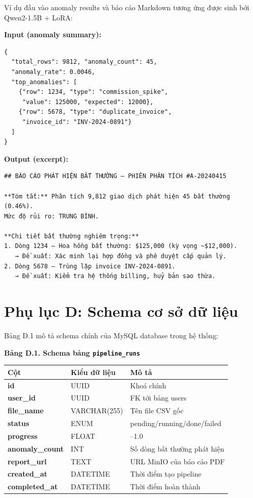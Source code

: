 Ví dụ đầu vào anomaly results và báo cáo Markdown tương ứng được sinh bởi Qwen2-1.5B + LoRA:

\textbf{Input (anomaly summary):}
\begin{verbatim}
{
  "total_rows": 9812, "anomaly_count": 45,
  "anomaly_rate": 0.0046,
  "top_anomalies": [
    {"row": 1234, "type": "commission_spike",
     "value": 125000, "expected": 12000},
    {"row": 5678, "type": "duplicate_invoice",
     "invoice_id": "INV-2024-0891"}
  ]
}
\end{verbatim}

\textbf{Output (excerpt):}
\begin{verbatim}
## BÁO CÁO PHÁT HIỆN BẤT THƯỜNG – PHIÊN PHÂN TÍCH #A-20240415

**Tóm tắt:** Phân tích 9,812 giao dịch phát hiện 45 bất thường (0.46%).
Mức độ rủi ro: TRUNG BÌNH.

**Chi tiết bất thường nghiêm trọng:**
1. Dòng 1234 – Hoa hồng bất thường: $125,000 (kỳ vọng ~$12,000).
   → Đề xuất: Xác minh lại hợp đồng và phê duyệt cấp quản lý.
2. Dòng 5678 – Trùng lặp invoice INV-2024-0891.
   → Đề xuất: Kiểm tra hệ thống billing, huỷ bản sao thừa.
\end{verbatim}

\section*{Phụ lục D: Schema cơ sở dữ liệu}

Bảng D.1 mô tả schema chính của MySQL database trong hệ thống:

\begin{center}
\fontsize{11pt}{13pt}\selectfont
\textbf{Bảng D.1. Schema bảng \texttt{pipeline\_runs}}
\end{center}
\vspace{-6pt}
\noindent
\fontsize{11pt}{13pt}\selectfont
\begin{tabularx}{\textwidth}{|>{\bfseries}p{3.5cm}|p{2.5cm}|>{\raggedright\arraybackslash}X|}
\hline
\textbf{Cột} & \textbf{Kiểu dữ liệu} & \textbf{Mô tả} \\
\hline
id & UUID & Khoá chính \\
\hline
user\_id & UUID & FK tới bảng users \\
\hline
file\_name & VARCHAR(255) & Tên file CSV gốc \\
\hline
status & ENUM & pending/running/done/failed \\
\hline
progress & FLOAT & 0.0--1.0 \\
\hline
anomaly\_count & INT & Số dòng bất thường phát hiện \\
\hline
report\_url & TEXT & URL MinIO của báo cáo PDF \\
\hline
created\_at & DATETIME & Thời điểm tạo pipeline \\
\hline
completed\_at & DATETIME & Thời điểm hoàn thành \\
\hline
\end{tabularx}
